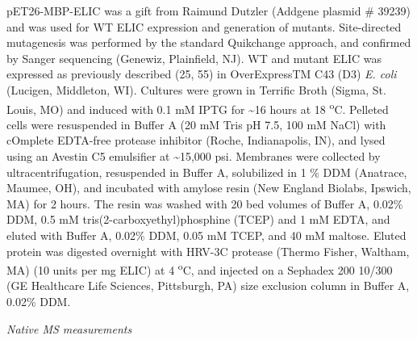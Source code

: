 pET26-MBP-ELIC was a gift from Raimund Dutzler (Addgene plasmid \#
39239) and was used for WT ELIC expression and generation of mutants.
Site-directed mutagenesis was performed by the standard Quikchange
approach, and confirmed by Sanger sequencing (Genewiz, Plainfield, NJ).
WT and mutant ELIC was expressed as previously described (25, 55) in
OverExpressTM C43 (D3) \emph{E. coli} (Lucigen, Middleton, WI). Cultures
were grown in Terrific Broth (Sigma, St. Louis, MO) and induced with 0.1
mM IPTG for \textasciitilde{}16 hours at 18 \textsuperscript{o}C.
Pelleted cells were resuspended in Buffer A (20 mM Tris pH 7.5, 100 mM
NaCl) with cOmplete EDTA-free protease inhibitor (Roche, Indianapolis,
IN), and lysed using an Avestin C5 emulsifier at \textasciitilde{}15,000
psi. Membranes were collected by ultracentrifugation, resuspended in
Buffer A, solubilized in 1 \% DDM (Anatrace, Maumee, OH), and incubated
with amylose resin (New England Biolabs, Ipswich, MA) for 2 hours. The
resin was washed with 20 bed volumes of Buffer A, 0.02\% DDM, 0.5 mM
tris(2-carboxyethyl)phosphine (TCEP) and 1 mM EDTA, and eluted with
Buffer A, 0.02\% DDM, 0.05 mM TCEP, and 40 mM maltose. Eluted protein
was digested overnight with HRV-3C protease (Thermo Fisher, Waltham, MA)
(10 units per mg ELIC) at 4 \textsuperscript{o}C, and injected on a
Sephadex 200 10/300 (GE Healthcare Life Sciences, Pittsburgh, PA) size
exclusion column in Buffer A, 0.02\% DDM.

\emph{Native MS measurements}

